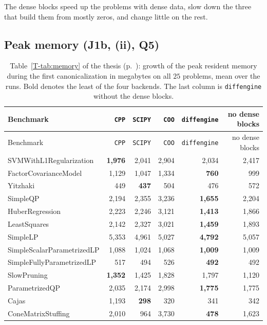 \documentclass[letterpaper,12pt]{article}
\newcommand{\tpage}[1]{p.~\pageref{T-#1}}
\begin{document}
The dense blocks speed up the problems with dense data, slow down the three that build
them from mostly zeros, and change little on the rest.

\FloatBarrier
\subsection{Peak memory (J1b, (ii), Q5)}

{\small
\begin{longtable}{l rrrrr}
\caption{Table~\ref{T-tab:memory} of the thesis (\tpage{tab:memory}): growth of the peak
resident memory during the first canonicalization in megabytes on all $25$ problems, mean over
the runs. Bold denotes the least of the four backends. The last column is
\texttt{diffengine} without the dense blocks.}\label{tab:sup-memory}\\
\toprule
Benchmark & \texttt{CPP} & \texttt{SCIPY} & \texttt{COO} & \texttt{diffengine} &
no dense blocks \\
\midrule
\endfirsthead
\toprule
Benchmark & \texttt{CPP} & \texttt{SCIPY} & \texttt{COO} & \texttt{diffengine} &
no dense blocks \\
\midrule
\endhead
\bottomrule
\endfoot
SVMWithL1Regularization & \textbf{1{,}976} & 2{,}041 & 2{,}904 & 2{,}034 & 2{,}417 \\
FactorCovarianceModel & 1{,}129 & 1{,}047 & 1{,}334 & \textbf{760} & 999 \\
Yitzhaki & 449 & \textbf{437} & 504 & 476 & 572 \\
SimpleQP & 2{,}194 & 2{,}355 & 3{,}236 & \textbf{1{,}655} & 2{,}204 \\
HuberRegression & 2{,}223 & 2{,}246 & 3{,}121 & \textbf{1{,}413} & 1{,}866 \\
LeastSquares & 2{,}142 & 2{,}327 & 3{,}021 & \textbf{1{,}459} & 1{,}893 \\
SimpleLP & 5{,}353 & 4{,}961 & 5{,}027 & \textbf{4{,}792} & 5{,}057 \\
SimpleScalarParametrizedLP & 1{,}088 & 1{,}024 & 1{,}068 & \textbf{1{,}009} & 1{,}009 \\
SimpleFullyParametrizedLP & 517 & 494 & 526 & \textbf{492} & 492 \\
SlowPruning & \textbf{1{,}352} & 1{,}425 & 1{,}828 & 1{,}797 & 1{,}120 \\
ParametrizedQP & 2{,}035 & 2{,}174 & 2{,}998 & \textbf{1{,}775} & 1{,}775 \\
Cajas & 1{,}193 & \textbf{298} & 320 & 341 & 342 \\
ConeMatrixStuffing & 2{,}010 & 964 & 3{,}730 & \textbf{478} & 1{,}623 \\

\end{longtable}}
\end{document}
